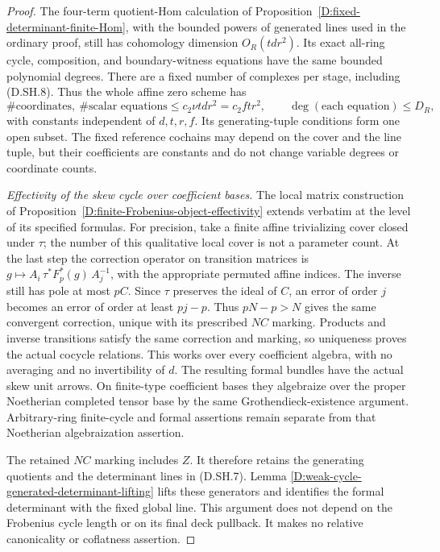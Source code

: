 \begin{proof}
The four-term quotient-Hom calculation of
Proposition~\ref{D:fixed-determinant-finite-Hom}, with the
bounded powers of generated lines used in the ordinary
proof, still has cohomology dimension $O_R(td r^2)$.
Its exact all-ring cycle, composition, and boundary-witness
equations have the same bounded polynomial degrees.
There are a fixed number of complexes per stage, including
(D.SH.8). Thus the whole affine zero scheme has
\[
 \#\text{coordinates},\ \#\text{scalar equations}
       \le c_2\nu td r^2=c_2ft r^2,
 \qquad \deg(\text{each equation})\le D_R,             \tag{D.SH.9}
\]
with constants independent of $d,t,r,f$.
Its generating-tuple conditions form one open subset.
The fixed reference cochains may depend on the cover and
the line tuple, but their coefficients are constants and
do not change variable degrees or coordinate counts.

\emph{Effectivity of the skew cycle over coefficient bases.}
The local matrix construction of
Proposition~\ref{D:finite-Frobenius-object-effectivity}
extends verbatim at the level of its specified formulas.
For precision, take a finite affine trivializing cover
closed under $\tau$; the number of this qualitative local
cover is not a parameter count. At the last step the
correction operator on transition matrices is
$g\mapsto A_i\,\tau^*F_p^*(g)\,A_j^{-1}$, with the
appropriate permuted affine indices. The inverse still
has pole at most $pC$. Since $\tau$ preserves the ideal
of $C$, an error of order $j$ becomes an error of order
at least $pj-p$. Thus $pN-p>N$ gives the same convergent
correction, unique with its prescribed $NC$ marking.
Products and inverse transitions satisfy the same
correction and marking, so uniqueness proves the actual
cocycle relations. This works over every coefficient
algebra, with no averaging and no invertibility of $d$.
The resulting formal bundles have the actual skew unit
arrows. On finite-type coefficient bases they algebraize
over the proper Noetherian completed tensor base by the
same Grothendieck-existence argument. Arbitrary-ring
finite-cycle and formal assertions remain separate from
that Noetherian algebraization assertion.

The retained $NC$ marking includes $Z$. It therefore
retains the generating quotients and the determinant
lines in (D.SH.7). Lemma
\ref{D:weak-cycle-generated-determinant-lifting} lifts
these generators and identifies the formal determinant
with the fixed global line. This argument does not depend
on the Frobenius cycle length or on its final deck pullback.
It makes no relative canonicality or coflatness assertion.


\end{proof}
